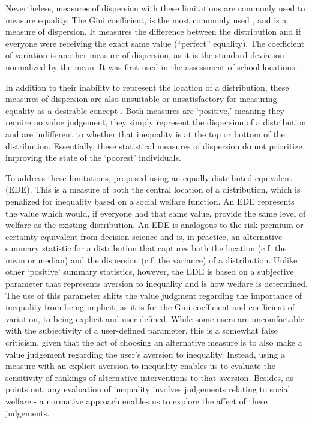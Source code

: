 \documentclass[final,3p,times,onecolumn,sort&compress]{elsarticle}
\begin{document}
Nevertheless, measures of dispersion with these limitations are commonly used to measure equality.
The Gini coefficient, is the most commonly used \citep{Whitehead2019-tf, Maguire2011-fi}, and is a measure of dispersion.
It measures the difference between the distribution and if everyone were receiving the exact same value (``perfect'' equality). 
The coefficient of variation is another measure of dispersion, as it is the standard deviation normalized by the mean. 
It was first used in the assessment of school locations \citep{Pacione1989-ui}.

In addition to their inability to represent the location of a distribution, these measures of dispersion are also unsuitable or unsatisfactory for measuring equality as a desirable concept \citep{Maguire2011-fi, Atkinson1970-mr, Adger1997-tu}.
Both measures are `positive,' meaning they require no value judgement, they simply represent the dispersion of a distribution and are indifferent to whether that inequality is at the top or bottom of the distribution.
Essentially, these statistical measures of dispersion do not prioritize improving the state of the `poorest' individuals.

To address these limitations, \cite{Atkinson1970-mr} proposed using an equally-distributed equivalent (EDE).
This is a measure of both the central location of a distribution, which is penalized for inequality based on a social welfare function. 
An EDE represents the value which would, if everyone had that same value, provide the same level of welfare as the existing distribution.
An EDE is analogous to the risk premium or certainty equivalent from decision science and is, in practice, an alternative summary statistic for a distribution that captures both the location (c.f. the mean or median) and the dispersion (c.f. the variance) of a distribution.  
Unlike other `positive' summary statistics, however, the EDE is based on a subjective parameter that represents aversion to inequality and is how welfare is determined.
The use of this parameter shifts the value judgment regarding the importance of inequality from being implicit, as it is for the Gini coefficient and coefficient of variation, to being explicit and user defined.
While some users are uncomfortable with the subjectivity of a user-defined parameter, this is a somewhat false criticism, given that the act of choosing an alternative measure is to also make a value judgement regarding the user's aversion to inequality. 
Instead, using a measure with an explicit aversion to inequality enables us to evaluate the sensitivity of rankings of alternative interventions to that aversion.
Besides, as \cite{Atkinson1970-mr} points out, any evaluation of inequality involves judgements relating to social welfare - a normative approach enables us to explore the affect of these judgements.
\end{document}
